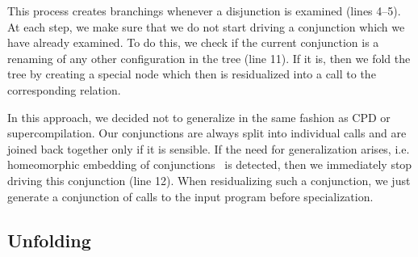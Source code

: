 This process creates branchings whenever a disjunction is examined (lines 4--5).
At each step, we make sure that we do not start driving a conjunction which we have already examined.
To do this, we check if the current conjunction is a renaming of any other configuration in the tree (line 11).
If it is, then we fold the tree by creating a special node which then is residualized into a call to the corresponding relation.

In this approach, we decided not to generalize in the same fashion as CPD or supercompilation.
Our conjunctions are always split into individual calls and are joined back together only if it is sensible.
If the need for generalization arises, i.e. homeomorphic embedding of conjunctions~\cite{de1999conjunctive} is detected, then we immediately stop driving this conjunction (line 12).
When residualizing such a conjunction, we just generate a conjunction of calls to the input program before specialization.




\subsection{Unfolding}

